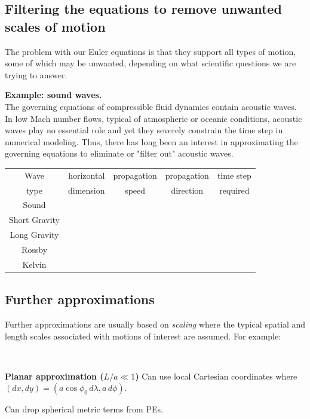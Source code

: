 \documentclass[11pt,fleqn]{book} %
\begin{document}
\subsection{Filtering the equations to remove unwanted scales of motion} 
	
	The problem with our Euler equations is that they support all types of motion, some of which may be unwanted, depending on what scientific questions we are trying to answer. 
	
	\medskip
	
	{\bf Example: sound waves.}\\
	The governing equations of compressible fluid dynamics contain acoustic waves. In low Mach number flows, typical of atmospheric or oceanic conditions, acoustic waves play no essential role and yet they severely constrain the time step in numerical modeling. Thus, there has long been an interest in approximating the governing equations to eliminate or "filter out" acoustic waves. 
	
	\medskip
	
	\begin{tabular}{|c|c|c|c|c|}
		\hline
		Wave & horizontal & propagation & propagation  & time step \\
		type & dimension & speed & direction & required \\
		\hline
		Sound &  &  &  & \\
		\hline
		Short Gravity &  &  &  & \\
		\hline
		Long Gravity &  &  &  & \\
		\hline
		Rossby &  &  & & \\
		\hline
		Kelvin &  &  &  & \\
		\hline
	\end{tabular}
	

\subsection{Further approximations} 
	
   Further approximations are usually based on {\em scaling} where
	the typical spatial and length scales associated with motions of
	interest are assumed. For example:
	
	~
	
	{\bf Planar approximation ($L/a \ll 1$)} Can use local Cartesian coordinates where $(dx,dy)=(a \cos\phi_0
	\,d\lambda, a\,d\phi)$. 
	
	Can drop spherical metric terms from PEs.
	
\end{document}
